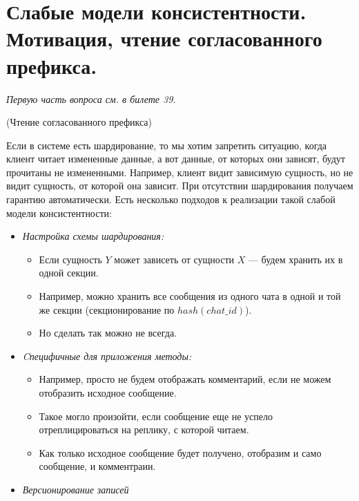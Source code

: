 \section{Слабые модели консистентности. Мотивация, чтение согласованного префикса.}

\textit{Первую часть вопроса см. в билете 39.}

\begin{example}(Чтение согласованного префикса)

Если в системе есть шардирование, то мы хотим запретить ситуацию, когда клиент читает измененные данные, а вот данные, от которых они зависят, будут прочитаны не измененными. Например, клиент видит зависимую сущность, но не видит сущность, от которой она зависит. При отсутствии шардирования получаем гарантию автоматически. Есть несколько подходов к реализации такой слабой модели консистентности:

\begin{itemize}
    \item \textit{Настройка схемы шардирования:}
    \begin{itemize}
        \item Если сущность $Y$ может зависеть от сущности $X$ --- будем хранить их в одной секции.
        \item Например, можно хранить все сообщения из одного чата в одной и той же секции (секционирование по $hash(chat\_id)$).
        \item Но сделать так можно не всегда.
    \end{itemize}

    \item \textit{Cпецифичные для приложения методы:}
    \begin{itemize}
        \item Например, просто не будем отображать комментарий, если не можем отобразить исходное сообщение.
        \item Такое могло произойти, если сообщение еще не успело отреплицироваться на реплику, с которой читаем.
        \item Как только исходное сообщение будет получено, отобразим и само сообщение, и комментраии.
    \end{itemize}

    \item \textit{Версионирование записей}

\end{itemize}

\end{example}


